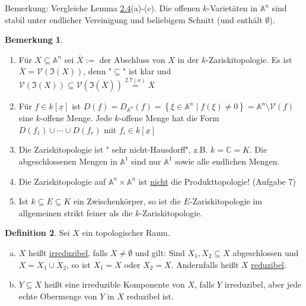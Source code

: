 \documentclass[
twoside=semi,
fontsize=12,
DIV=12, 
cleardoublepage=current,
leqno,
headings=optiontoheadandtoc, 
toc=idx
]{scrbook}
\newcommand{\C}{\mathbb{C}}
\newcommand{\A}{\mathbb{A}}
\newcommand{\V}{\mathcal{V}}
\newcommand{\x}{\underline{x}}
\newcommand{\I}{\mathfrak{I}}
\newcommand{\set}[1]{\left\{ #1 \right\}}
\newcommand{\emphasize}[1]{\underline{#1}}
\theoremstyle{definition}
\newtheorem{definition}{Definition}[section]
\newtheorem{bemerkung}[definition]{Bemerkung}
\begin{document}
	\noindent Bemerkung: Vergleiche Lemma \hyperref[1.2.4]{2.4}(a)-(c). Die offenen $k$-Variet\"aten in $\A^n$ sind stabil unter endlicher Vereinigung und beliebigem Schnitt (und enth\"alt $\emptyset$).
	
	\begin{bemerkung}\label{1.3.2}
		\begin{enumerate}[1.]
			\item 
			F\"ur $X \subseteq \A^n$ sei $\overline{X}:=$ der Abschluss von $X$ in der $k$-Zariskitopologie. Es ist $\overline{X} = \V(\I(X))$, denn "$\subseteq$" ist klar und
			$\V(\I(X)) \subseteq \V(\I(\overline{X})) \overset{\hyperref[1.2.7]{2.7(a)}}{=} \overline{X}$
			
			\item
			F\"ur $f \in k[\x]$ ist $D(f) = D_{\A^n}(f) = \set{\xi \in \A^n\mid f(\xi) \neq 0} = \A^n \setminus \V(f)$ eine $k$-offene Menge. Jede $k$-offene Menge hat die Form $D(f_1) \cup \cdots \cup D(f_r)$ mit $f_i \in k[\x]$   
			
			\item Die Zariskitopologie ist " sehr nicht-Hausdorff", z.B. $k = \C = K$. Die abgeschlossenen Mengen in $\A^1$ sind nur $\A^1$ sowie alle endlichen Mengen.
			
			\item Die Zariskitopologie auf $\A^n\times \A^n$ ist \emphasize{nicht} die Produkttopologie! (Aufgabe 7)
			
			\item Ist $k \subseteq E \subseteq K$ ein Zwischenk\"orper, so ist die $E$-Zariskitopologie im allgemeinen strikt feiner als die $k$-Zariskitopologie.
		\end{enumerate}
	\end{bemerkung}

	\begin{definition}\label{1.3.3}\hfill\newline
		Sei $X$ ein topologischer Raum.
		\begin{enumerate}[(a)]
			\item $X$ hei\ss t \emphasize{irreduzibel}, falls $X \neq \emptyset$ und gilt: Sind $X_1, X_2 \subseteq X$ abgeschlossen und $X = X_1 \cup X_2$, so ist $X_1 = X$ oder $X_2 = X$. Andernfalls hei\ss t $X$ \emphasize{reduzibel}.
			
			\item $Y \subseteq X$ hei\ss t eine irreduzible Komponente von $X$, falls $Y$ irreduzibel, aber jede echte Obermenge von $Y$ in $X$ reduzibel ist. 
		\end{enumerate}
	\end{definition}
\end{document}
